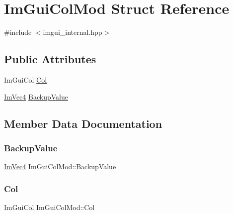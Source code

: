 \hypertarget{struct_im_gui_col_mod}{}\section{Im\+Gui\+Col\+Mod Struct Reference}
\label{struct_im_gui_col_mod}


{\ttfamily \#include $<$imgui\+\_\+internal.\+hpp$>$}

\subsection*{Public Attributes}
\begin{DoxyCompactItemize}
\item 
Im\+Gui\+Col \hyperlink{struct_im_gui_col_mod_aaa66ad29c378b8800098ab4d4e1c91a6}{Col}
\item 
\hyperlink{struct_im_vec4}{Im\+Vec4} \hyperlink{struct_im_gui_col_mod_a7c23f178bbf5cbdb1333332bb84f73c9}{Backup\+Value}
\end{DoxyCompactItemize}


\subsection{Member Data Documentation}
\hypertarget{struct_im_gui_col_mod_a7c23f178bbf5cbdb1333332bb84f73c9}{}\label{struct_im_gui_col_mod_a7c23f178bbf5cbdb1333332bb84f73c9} 
\subsubsection{\texorpdfstring{Backup\+Value}{BackupValue}}
{\footnotesize\ttfamily \hyperlink{struct_im_vec4}{Im\+Vec4} Im\+Gui\+Col\+Mod\+::\+Backup\+Value}

\hypertarget{struct_im_gui_col_mod_aaa66ad29c378b8800098ab4d4e1c91a6}{}\label{struct_im_gui_col_mod_aaa66ad29c378b8800098ab4d4e1c91a6} 
\subsubsection{\texorpdfstring{Col}{Col}}
{\footnotesize\ttfamily Im\+Gui\+Col Im\+Gui\+Col\+Mod\+::\+Col}

